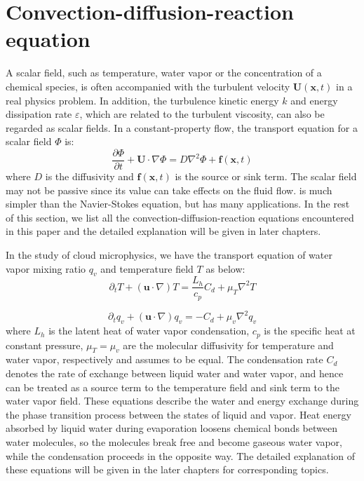 \section{Convection-diffusion-reaction equation}
A scalar field, such as temperature, water vapor or the concentration of a chemical species, is often accompanied with the turbulent velocity $\mathbf{U}(\mathbf{x},t)$ in a real physics problem. In addition, the turbulence kinetic energy $k$ and energy dissipation rate $\varepsilon$, which are related to the turbulent viscosity, can also be regarded as scalar fields. In a constant-property flow, the transport equation for a scalar field $\Phi$ is:
\begin{equation}
\frac{\partial\Phi}{\partial t} + \mathbf{U}\cdot\nabla\Phi = D\nabla^2\Phi + \mathbf{f}(\mathbf{x},t)
\label{scal_eqn}
\end{equation}
where $D$ is the diffusivity and $\mathbf{f}(\mathbf{x},t)$ is the source or sink term. The scalar field may not be passive since its value can take effects on the fluid flow.  is much simpler than the Navier-Stokes equation, but has many applications.
In the rest of this section, we list all the convection-diffusion-reaction equations encountered in this paper and the detailed explanation will be given in later chapters.

In the study of cloud microphysics, we have the transport equation of water vapor mixing ratio $q_v$ and temperature field $T$ as below:
\begin{equation}
\partial_{t}T+(\mathbf{u}\cdot\nabla)T=\frac{L_{h}}{c_{p}}C_{d}+\mu_{T}\nabla^{2}T\label{eq:temp_eqn}
\end{equation}

\begin{equation}
\partial_{t}q_{v}+(\mathbf{u}\cdot\nabla)q_{v}=-C_{d}+\mu_{v}\nabla^{2}q_{v}\label{eq:vap_eqn}
\end{equation}
where $L_{h}$ is the latent heat of water vapor condensation, $c_{p}$ is the specific heat at constant pressure, $\mu_{T}=\mu_{v}$ are the molecular diffusivity for temperature and water vapor, respectively and assumes to be equal. The condensation rate $C_{d}$ denotes the rate of exchange between liquid water and water vapor, and hence can be treated as a source term to the temperature field and sink term to the water vapor field. These equations describe the water and energy exchange during the phase transition process between the states of liquid and vapor. Heat energy absorbed by liquid water during evaporation loosens chemical bonds between water molecules, so the molecules break free and become gaseous water vapor, while the condensation proceeds in the opposite way. The detailed explanation of these equations will be given in the later chapters for corresponding topics.

